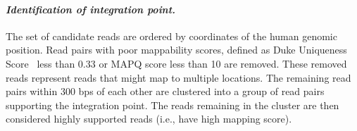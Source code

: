 \documentclass[10pt]{article}
\begin{document}
\paragraph{\emph{Identification of integration point.}}  The set of candidate reads are ordered by coordinates of the human genomic position.  Read pairs with poor mappability scores, defined as Duke Uniqueness Score~\cite{unknown} less than 0.33 or MAPQ score less than 10 are removed.  These removed reads represent reads that might map to multiple locations.  The remaining read pairs within 300 bps of each other are clustered into a group of read pairs supporting the integration point.  The reads remaining in the cluster are then considered highly supported reads (i.e., have high mapping score).  



\end{document}
